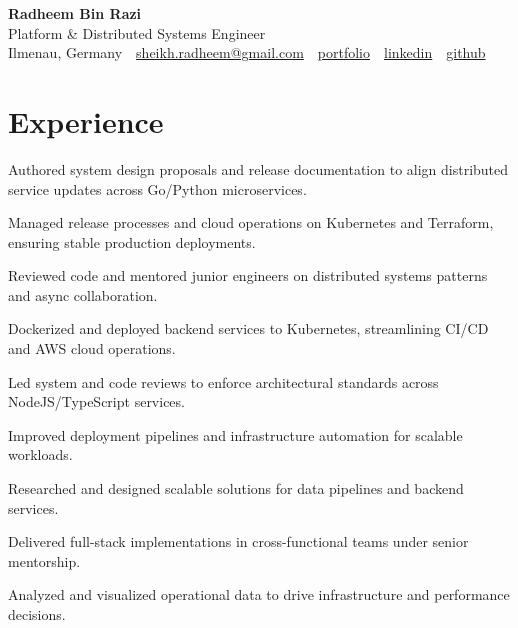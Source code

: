 \documentclass[11pt,a4paper]{resume}
\makeatletter
\newcommand{\Portfolio}{https://radheem.github.io/my-cv}
\newcommand{\PortfolioText}{portfolio}
\newcommand{\GitHub}{https://github.com/radheem}
\newcommand{\LinkedIn}{https://www.linkedin.com/in/radheem-razi}
\newcommand{\Email}{sheikh.radheem@gmail.com}
\makeatother
\begin{document}
\begin{center}
  {\huge\bfseries Radheem Bin Razi}\\[3pt]
  {\large Platform \& Distributed Systems Engineer}\\[6pt]
  \small
  Ilmenau, Germany \,\textbar\,
  \href{mailto:\Email}{\Email} \,\textbar\,
  \href{\Portfolio}{\PortfolioText} \,\textbar\,
  \href{\LinkedIn}{linkedin} \,\textbar\,
  \href{\GitHub}{github}
\end{center}
\vspace{2pt}

\section{Experience}

\bullets
  \item Authored system design proposals and release documentation to align distributed service updates across Go/Python microservices.
  \item Managed release processes and cloud operations on Kubernetes and Terraform, ensuring stable production deployments.
  \item Reviewed code and mentored junior engineers on distributed systems patterns and async collaboration.
\bulletsend
\vspace{3pt}
\bullets
  \item Dockerized and deployed backend services to Kubernetes, streamlining CI/CD and AWS cloud operations.
  \item Led system and code reviews to enforce architectural standards across NodeJS/TypeScript services.
  \item Improved deployment pipelines and infrastructure automation for scalable workloads.
\bulletsend
\vspace{3pt}
\bullets
  \item Researched and designed scalable solutions for data pipelines and backend services.
  \item Delivered full-stack implementations in cross-functional teams under senior mentorship.
  \item Analyzed and visualized operational data to drive infrastructure and performance decisions.
\bulletsend
\vspace{3pt}
\end{document}
